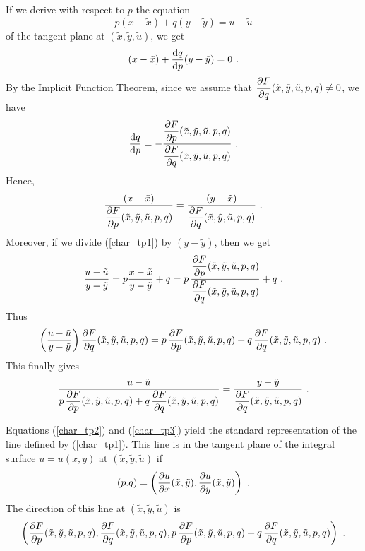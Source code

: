 If we derive with respect to $p$ the equation
\begin{equation} \label{char_tp1}
p(x-\tilde{x}) + q(y-\tilde{y}) = u-\tilde{u}
\end{equation}
of the tangent plane at $(\tilde{x},\tilde{y},\tilde{u})$, we get
\[
(x-\tilde{x}) + \frac{\mathrm{d}q}{\mathrm{d}{p}}(y-\tilde{y}) = 0 \ .
\]
By the Implicit Function Theorem, since we assume that
$\displaystyle \frac{\partial{F}}{\partial q}(\tilde{x},\tilde{y},\tilde{u},p,q) \neq 0$,
we have 
\[
\frac{\mathrm{d}q}{\mathrm{d}{p}} =
- \frac{\displaystyle \frac{\partial{F}}{\partial p}(\tilde{x},\tilde{y},\tilde{u},p,q)}
{\displaystyle \frac{\partial{F}}{\partial q}(\tilde{x},\tilde{y},\tilde{u},p,q)} \ .
\]
Hence,
\begin{equation} \label{char_tp2}
\frac{(x-\tilde{x})}{\displaystyle \frac{\partial{F}}{\partial p}
(\tilde{x},\tilde{y},\tilde{u},p,q)} = 
\frac{(y-\tilde{x})}{\displaystyle \frac{\partial{F}}{\partial q}
(\tilde{x},\tilde{y},\tilde{u},p,q)} \ .
\end{equation}
Moreover, if we divide (\ref{char_tp1}) by $(y-\tilde{y})$, then we get
\[
\frac{u-\tilde{u}}{y-\tilde{y}} = p\frac{x-\tilde{x}}{y-\tilde{y}} + q = 
p\, \frac{\displaystyle \frac{\partial{F}}{\partial p}(\tilde{x},\tilde{y},\tilde{u},p,q)}
{\displaystyle \frac{\partial{F}}{\partial q}(\tilde{x},\tilde{y},\tilde{u},p,q)} + q \ .
\]
Thus
\[
\left(\frac{u-\tilde{u}}{y-\tilde{y}}\right)
\frac{\partial{F}}{\partial q}(\tilde{x},\tilde{y},\tilde{u},p,q) = 
p\, \frac{\partial{F}}{\partial p}(\tilde{x},\tilde{y},\tilde{u},p,q)
+ q\, \frac{\partial{F}}{\partial q}(\tilde{x},\tilde{y},\tilde{u},p,q) \ .
\]
This finally gives
\begin{equation} \label{char_tp3}
\frac{u-\tilde{u}}{\displaystyle p\,
\frac{\partial{F}}{\partial p}(\tilde{x},\tilde{y},\tilde{u},p,q) +
q\, \frac{\partial{F}}{\partial q}(\tilde{x},\tilde{y},\tilde{u},p,q)}
= \frac{y-\tilde{y}}
{\displaystyle \frac{\partial{F}}{\partial q}(\tilde{x},\tilde{y},\tilde{u},p,q)} \ .
\end{equation}

Equations (\ref{char_tp2}) and (\ref{char_tp3}) yield the
standard representation of the line defined by (\ref{char_tp1}).  This
line is in the tangent plane of the integral surface
$u=u(x,y)$ at $(\tilde{x},\tilde{y},\tilde{u})$ if
\[
(p.q) = \left( \frac{\partial{u}}{\partial x}(\tilde{x},\tilde{y}) ,
\frac{\partial{u}}{\partial y}(\tilde{x},\tilde{y}) \right) \ .
\]
The direction of this line at $(\tilde{x},\tilde{y},\tilde{u})$ is
\[
\left( \pdydx{F}{p}(\tilde{x},\tilde{y},\tilde{u},p,q),
\pdydx{F}{q}(\tilde{x},\tilde{y},\tilde{u},p,q) ,
p\, \pdydx{F}{p}(\tilde{x},\tilde{y},\tilde{u},p,q)
+ q\, \pdydx{F}{q}(\tilde{x},\tilde{y},\tilde{u},p,q) \right) \ .
\]

